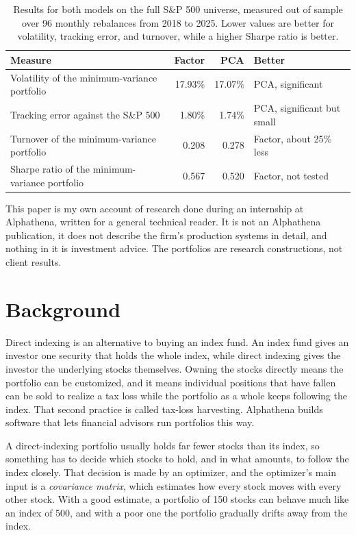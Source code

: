 \documentclass[11pt,letterpaper]{article}
\newcommand{\F}{\textcolor{factor}{\textbf{Factor}}}
\newcommand{\Pc}{\textcolor{pca}{\textbf{PCA}}}
\begin{document}
\begin{table}[H]
\centering\small
\begin{tabular}{@{}lrrl@{}}
\toprule
\textbf{Measure} & \F & \Pc & \textbf{Better} \\
\midrule
Volatility of the minimum-variance portfolio & 17.93\% & 17.07\% & PCA, significant \\
Tracking error against the S\&P 500 & 1.80\% & 1.74\% & PCA, significant but small \\
Turnover of the minimum-variance portfolio & 0.208 & 0.278 & Factor, about 25\% less \\
Sharpe ratio of the minimum-variance portfolio & 0.567 & 0.520 & Factor, not tested \\
\bottomrule
\end{tabular}
\caption{Results for both models on the full S\&P 500 universe, measured out of sample over
96 monthly rebalances from 2018 to 2025. Lower values are better for volatility, tracking
error, and turnover, while a higher Sharpe ratio is better.}
\label{tab:scorecard}
\end{table}

\vfill
{\footnotesize\color{muted} This paper is my own account of research done during an
internship at Alphathena, written for a general technical reader. It is not an Alphathena
publication, it does not describe the firm's production systems in detail, and nothing in
it is investment advice. The portfolios are research constructions, not client results.\par}
\newpage

\section{Background}

Direct indexing is an alternative to buying an index fund. An index fund gives an investor
one security that holds the whole index, while direct indexing gives the investor the
underlying stocks themselves. Owning the stocks
directly means the portfolio can be customized, and it means individual positions that have
fallen can be sold to realize a tax loss while the portfolio as a whole keeps following the
index. That second practice is called tax-loss harvesting. Alphathena builds software that
lets financial advisors run portfolios this way.

A direct-indexing portfolio usually holds far fewer stocks than its index, so something has
to decide which stocks to hold, and in what amounts, to follow the index closely. That
decision is made by an optimizer, and the optimizer's main input is a \emph{covariance
matrix}, which estimates how every stock moves with every other stock. With a good estimate,
a portfolio of 150 stocks can behave much like an index of 500, and with a poor one the
portfolio gradually drifts away from the index.
\end{document}
